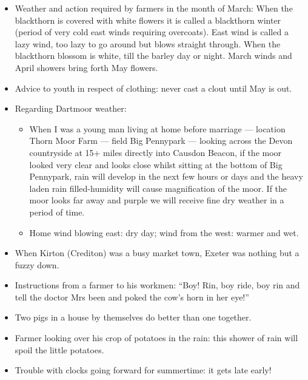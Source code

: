 
\begin{itemize}
  \item Weather and action required by farmers in the month of March: When the
   blackthorn is covered with white flowers it is called a blackthorn winter
   (period of very cold east winds requiring overcoats).  East wind is called a
   lazy wind, too lazy to go around but blows straight through. When the
   blackthorn blossom is white, till the barley day or night. March winds and
   April showers bring forth May flowers.

  \item Advice to youth in respect of clothing: never cast a clout until May is
   out.

  \item Regarding Dartmoor weather:
  \begin{itemize}
    \item When I was a young man living at home before marriage — location Thorn
     Moor Farm — field Big Pennypark — looking across the Devon countryside at
     15+ miles directly into Causdon Beacon, if the moor looked very clear and
     looks close whilst sitting at the bottom of Big Pennypark, rain will
     develop in the next few hours or days and the heavy laden rain
     filled-humidity will cause magnification of the moor. If the moor looks
     far away and purple we will receive fine dry weather in a period of time.
    \item Home wind blowing east: dry day; wind from the west: warmer and wet.
  \end{itemize}

  \item When Kirton (Crediton) was a busy market town, Exeter was nothing but a
   fuzzy down.

  \item Instructions from a farmer to his workmen: ``Boy! Rin, boy ride, boy rin
   and tell the doctor Mrs been and poked the cow's horn in her eye!''

  \item Two pigs in a house by themselves do better than one together.

  \item Farmer looking over his crop of potatoes in the rain: this shower of
   rain will spoil the little potatoes.

  \item Trouble with clocks going forward for summertime: it gets late early!
\end{itemize}